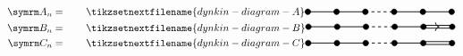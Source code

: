 \begin{align}
    \A[n] &= \qquad
    \tikzsetnextfilename{dynkin-diagram-A}
    \begin{tikzpicture}[dynkin node/.style = {fill}, dynkin wire/.style = {thick}]
        \draw [dynkin node] (0, 0) circle [radius=0.1cm];
        \draw [dynkin wire] (0, 0) -- ++ (2, 0);
        \draw [dynkin node] (1, 0) circle [radius=0.1cm];
        \draw [dynkin node] (2, 0) circle [radius=0.1cm];
        \draw [dynkin wire, dashed] (2, 0) -- ++ (1, 0);
        \draw [dynkin wire] (3, 0) -- (5, 0);
        \draw [dynkin node] (3, 0) circle [radius=0.1cm];
        \draw [dynkin node] (4, 0) circle [radius=0.1cm];
        \draw [dynkin node] (5, 0) circle [radius=0.1cm];
    \end{tikzpicture}
    \\
    \B[n] &= \qquad
    \tikzsetnextfilename{dynkin-diagram-B}
    \begin{tikzpicture}[dynkin node/.style = {fill}, dynkin wire/.style = {thick}]
        \draw [dynkin node] (0, 0) circle [radius=0.1cm];
        \draw [dynkin wire] (0, 0) -- ++ (2, 0);
        \draw [dynkin node] (1, 0) circle [radius=0.1cm];
        \draw [dynkin node] (2, 0) circle [radius=0.1cm];
        \draw [dynkin wire, dashed] (2, 0) -- ++ (1, 0);
        \draw [dynkin wire] (3, 0) -- (4, 0);
        \draw [dynkin wire] (4, -0.05) -- ++ (1, 0);
        \draw [dynkin wire] (4, 0.05) -- ++ (1, 0);
        \draw [dynkin node] (3, 0) circle [radius=0.1cm];
        \draw [dynkin node] (4, 0) circle [radius=0.1cm];
        \draw [dynkin node] (5, 0) circle [radius=0.1cm];
        \draw [-{>[width=0.3cm, length=0.15cm]}, dynkin wire] (4.55, 0) -- ++ (0.001, 0);
    \end{tikzpicture}
    \\
    \C[n] &= \qquad
    \tikzsetnextfilename{dynkin-diagram-C}
    \begin{tikzpicture}[dynkin node/.style = {fill}, dynkin wire/.style = {thick}]
        \draw [dynkin node] (0, 0) circle [radius=0.1cm];
        \draw [dynkin wire] (0, 0) -- ++ (2, 0);
        \draw [dynkin node] (1, 0) circle [radius=0.1cm];
        \draw [dynkin node] (2, 0) circle [radius=0.1cm];
        \draw [dynkin wire, dashed] (2, 0) -- ++ (1, 0);
        \draw [dynkin wire] (3, 0) -- (4, 0);
        \draw [dynkin wire] (4, -0.05) -- ++ (1, 0);
        \draw [dynkin wire] (4, 0.05) -- ++ (1, 0);
        \draw [dynkin node] (3, 0) circle [radius=0.1cm];
        \draw [dynkin node] (4, 0) circle [radius=0.1cm];
        \draw [dynkin node] (5, 0) circle [radius=0.1cm];

\end{tikzpicture}
\end{align}
